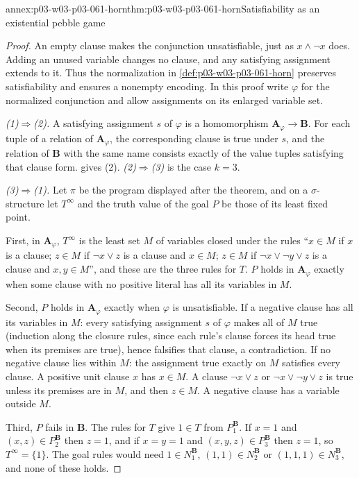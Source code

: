 \begin{annexitem}{annex:p03-w03-p03-061-horn}{thm:p03-w03-p03-061-horn}{Satisfiability as an existential pebble game}
\begin{proof}
An empty clause makes the conjunction unsatisfiable, just as
\(x\wedge\neg x\) does. Adding an unused variable changes no clause, and
any satisfying assignment extends to it. Thus the normalization in
\cref{def:p03-w03-p03-061-horn} preserves satisfiability and ensures a
nonempty encoding. In this proof write \(\varphi\) for the normalized
conjunction and allow assignments on its enlarged variable set.

\emph{(1)\(\Rightarrow\)(2).} A satisfying assignment \(s\) of \(\varphi\) is
a homomorphism \(\mathbf A_\varphi\to\mathbf B\). For each tuple of a relation
of \(\mathbf A_\varphi\), the corresponding clause is true under \(s\), and
the relation of \(\mathbf B\) with the same name consists exactly of the
value tuples satisfying that clause form. 
gives (2). \emph{(2)\(\Rightarrow\)(3)} is the case \(k=3\).

\emph{(3)\(\Rightarrow\)(1).} Let \(\pi\) be the program displayed after the
theorem, and on a \(\sigma\)-structure let \(T^\infty\) and the truth value
of the goal \(P\) be those of its least fixed point.

First, in \(\mathbf A_\varphi\), \(T^\infty\) is the least set \(M\) of
variables closed under the rules ``\(x\in M\) if \(x\) is a clause; \(z\in M\) if \(\neg
x\vee z\) is a clause and \(x\in M\); \(z\in M\) if \(\neg x\vee\neg y\vee z\)
is a clause and \(x,y\in M\)'', and these are the three rules for \(T\).
\(P\) holds in \(\mathbf A_\varphi\) exactly when some clause with no positive
literal has all its variables in \(M\).

Second, \(P\) holds in \(\mathbf A_\varphi\) exactly when \(\varphi\) is
unsatisfiable. If a negative clause has all its variables in \(M\): every
satisfying assignment \(s\) of \(\varphi\) makes all of \(M\) true (induction
along the closure rules, since each rule's clause forces its head true when
its premises are true), hence falsifies that clause, a contradiction. If no
negative clause lies within \(M\): the assignment true exactly on \(M\)
satisfies every clause. A positive unit clause \(x\) has \(x\in M\). A clause
\(\neg x\vee z\) or \(\neg x\vee\neg y\vee z\) is true unless its premises are
in \(M\), and then \(z\in M\). A negative clause has a variable outside \(M\).

Third, \(P\) fails in \(\mathbf B\). The rules for \(T\) give \(1\in T\) from
\(P_1^{\mathbf B}\). If \(x=1\) and \((x,z)\in P_2^{\mathbf B}\) then
\(z=1\), and if \(x=y=1\) and \((x,y,z)\in P_3^{\mathbf B}\) then \(z=1\), so
\(T^\infty=\{1\}\). The goal rules would need \(1\in N_1^{\mathbf B}\),
\((1,1)\in N_2^{\mathbf B}\) or \((1,1,1)\in N_3^{\mathbf B}\), and none of
these holds.


\end{proof}
\end{annexitem}
